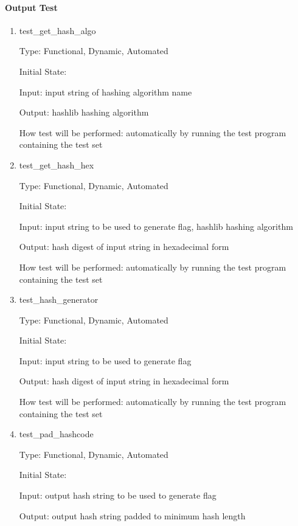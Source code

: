 \documentclass[12pt, titlepage]{article}
\begin{document}
\paragraph{Output Test}

\begin{enumerate}

\item{test\_get\_hash\_algo\\}

Type: Functional, Dynamic, Automated

Initial State:

Input: input string of hashing algorithm name

Output: hashlib hashing algorithm

How test will be performed: automatically by running the test program
containing the test set

\item{test\_get\_hash\_hex\\}

Type: Functional, Dynamic, Automated

Initial State:

Input: input string to be used to generate flag, hashlib hashing algorithm

Output: hash digest of input string in hexadecimal form

How test will be performed: automatically by running the test program
containing the test set

\item{test\_hash\_generator\\}

Type: Functional, Dynamic, Automated

Initial State:

Input: input string to be used to generate flag

Output: hash digest of input string in hexadecimal form

How test will be performed: automatically by running the test program
containing the test set

\item{test\_pad\_hashcode\\}

Type: Functional, Dynamic, Automated

Initial State:

Input: output hash string to be used to generate flag

Output: output hash string padded to minimum hash length


\end{enumerate}
\end{document}
